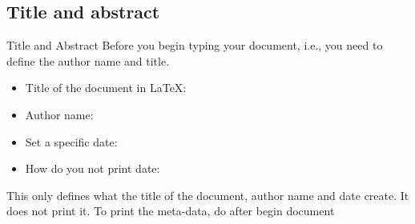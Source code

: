 \documentclass[10pt, notes]{beamer}
\begin{document}
\subsection{Title and abstract}
\begin{frame}{Title and Abstract}
Before you begin typing your document, i.e.,  you need 
to define the author name and title.
\begin{itemize}
\item Title of the document in \LaTeX: 
\item Author name: 
\item Set a specific date: 
\item How do you not print date: 
\end{itemize}
\centering
This only defines what the title of the document, author name and date create. 
It does not print it. To print the meta-data, do  after begin 
document
\end{frame}

\end{document}

